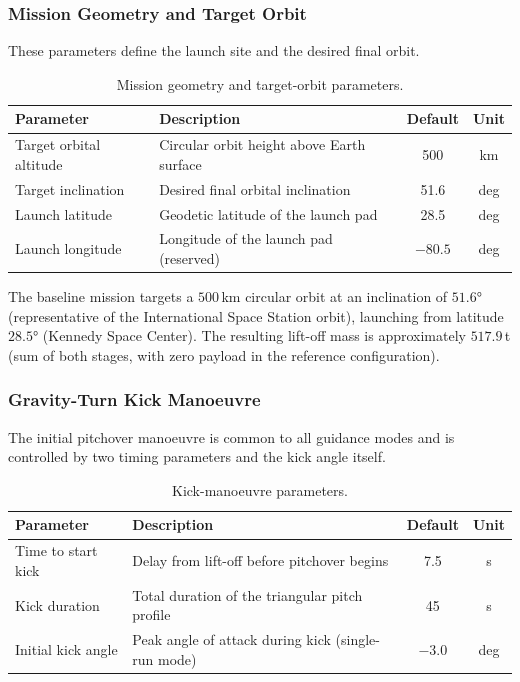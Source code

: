 \subsubsection{Mission Geometry and Target Orbit}

These parameters define the launch site and the desired final orbit.

\begin{table}[htbp]
  \centering
  \caption{Mission geometry and target-orbit parameters.}
  \label{tab:param_mission}
  \begin{tabular}{l l c c}
    \toprule
    \textbf{Parameter} & \textbf{Description} & \textbf{Default} & \textbf{Unit} \\
    \midrule
    Target orbital altitude    & Circular orbit height above Earth surface
                               & 500       & km   \\
    Target inclination         & Desired final orbital inclination
                               & 51.6      & deg  \\
    Launch latitude            & Geodetic latitude of the launch pad
                               & 28.5      & deg  \\
    Launch longitude           & Longitude of the launch pad (reserved)
                               & $-80.5$   & deg  \\
    \bottomrule
  \end{tabular}
\end{table}

The baseline mission targets a $500$\,km circular orbit at an inclination of
$51.6°$ (representative of the International Space Station orbit), launching
from latitude $28.5°$ (Kennedy Space Center).  The resulting lift-off mass is
approximately $517.9$\,t (sum of both stages, with zero payload in the
reference configuration).

\subsubsection{Gravity-Turn Kick Manoeuvre}

The initial pitchover manoeuvre is common to all guidance modes and is
controlled by two timing parameters and the kick angle itself.

\begin{table}[htbp]
  \centering
  \caption{Kick-manoeuvre parameters.}
  \label{tab:param_kick}
  \begin{tabular}{l l c c}
    \toprule
    \textbf{Parameter} & \textbf{Description} & \textbf{Default} & \textbf{Unit} \\
    \midrule
    Time to start kick   & Delay from lift-off before pitchover begins
                         & 7.5    & s    \\
    Kick duration        & Total duration of the triangular pitch profile
                         & 45     & s    \\
    Initial kick angle   & Peak angle of attack during kick (single-run mode)
                         & $-3.0$ & deg  \\
    \bottomrule
  \end{tabular}
\end{table}


